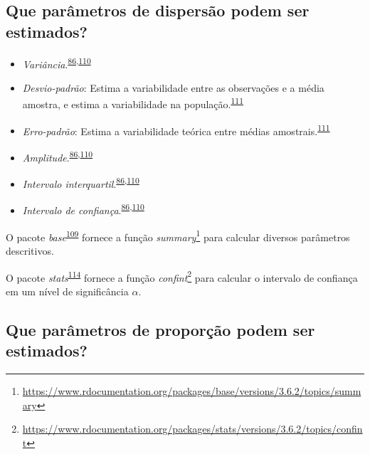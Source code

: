 \documentclass[
  a4paper,
]{book}
\renewcommand{\href}[2]{#2\footnote{\url{#1}}}
\newenvironment{infobox}[1]
  {
  \begin{itemize}
  \renewcommand{\labelitemi}{
    \raisebox{-.7\height}[0pt][0pt]{
      {\setkeys{Gin}{width=3em,keepaspectratio}
        \texttt{[image: \#1]}}
    }
  }
  \setlength{\fboxsep}{1em}
  \begin{blackbox}
  \item
  }
  {
  \end{blackbox}
  \end{itemize}
  }
\begin{document}
\hypertarget{que-paruxe2metros-de-dispersuxe3o-podem-ser-estimados}{%
\subsection{Que parâmetros de dispersão podem ser estimados?}\label{que-paruxe2metros-de-dispersuxe3o-podem-ser-estimados}}

\begin{itemize}
\item
  \emph{Variância}.\textsuperscript{\protect\hyperlink{ref-Ali2016}{86},\protect\hyperlink{ref-kanji2006}{110}}
\item
  \emph{Desvio-padrão}: Estima a variabilidade entre as observações e a média amostra, e estima a variabilidade na população.\textsuperscript{\protect\hyperlink{ref-Curran-Everett2008}{111}}
\item
  \emph{Erro-padrão}: Estima a variabilidade teórica entre médias amostrais.\textsuperscript{\protect\hyperlink{ref-Curran-Everett2008}{111}}
\item
  \emph{Amplitude}.\textsuperscript{\protect\hyperlink{ref-Ali2016}{86},\protect\hyperlink{ref-kanji2006}{110}}
\item
  \emph{Intervalo interquartil}.\textsuperscript{\protect\hyperlink{ref-Ali2016}{86},\protect\hyperlink{ref-kanji2006}{110}}
\item
  \emph{Intervalo de confiança}.\textsuperscript{\protect\hyperlink{ref-Ali2016}{86},\protect\hyperlink{ref-kanji2006}{110}}
\end{itemize}

\begin{infobox}{images/Rlogo}
O pacote \emph{base}\textsuperscript{\protect\hyperlink{ref-base-6}{109}} fornece a função \href{https://www.rdocumentation.org/packages/base/versions/3.6.2/topics/summary}{\emph{summary}} para calcular diversos parâmetros descritivos.

\end{infobox}

\begin{infobox}{images/Rlogo}
O pacote \emph{stats}\textsuperscript{\protect\hyperlink{ref-stats-4}{114}} fornece a função \href{https://www.rdocumentation.org/packages/stats/versions/3.6.2/topics/confint}{\emph{confint}} para calcular o intervalo de confiança em um nível de significância \(\alpha\).

\end{infobox}

\hypertarget{que-paruxe2metros-de-proporuxe7uxe3o-podem-ser-estimados}{%
\subsection{Que parâmetros de proporção podem ser estimados?}\label{que-paruxe2metros-de-proporuxe7uxe3o-podem-ser-estimados}}
\end{document}
